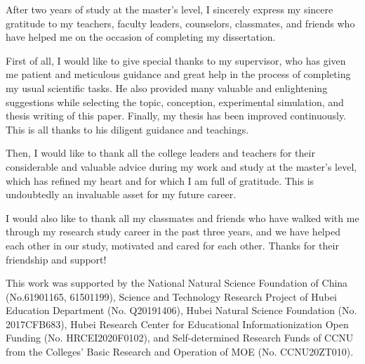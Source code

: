 
\begin{acknowledgments}




    After two years of study at the master's level, I sincerely express my sincere gratitude to my teachers, faculty leaders, counselors, classmates, and friends who have helped me on the occasion of completing my dissertation.

    First of all, I would like to give special thanks to my supervisor, who has given me patient and meticulous guidance and great help in the process of completing my usual scientific tasks. He also provided many valuable and enlightening suggestions while selecting the topic, conception, experimental simulation, and thesis writing of this paper. Finally, my thesis has been improved continuously. This is all thanks to his diligent guidance and teachings.

    Then, I would like to thank all the college leaders and teachers for their considerable and valuable advice during my work and study at the master's level, which has refined my heart and for which I am full of gratitude. This is undoubtedly an invaluable asset for my future career.

    I would also like to thank all my classmates and friends who have walked with me through my research study career in the past three years, and we have helped each other in our study, motivated and cared for each other. Thanks for their friendship and support!

    This work was supported by the National Natural Science Foundation of China (No.61901165, 61501199), Science and Technology Research Project of Hubei Education Department (No. Q20191406), Hubei Natural Science Foundation (No. 2017CFB683), Hubei Research Center for Educational Informationization Open Funding (No. HRCEI2020F0102), and Self-determined Research Funds of CCNU from the Colleges' Basic Research and Operation of MOE (No. CCNU20ZT010).

\end{acknowledgments}
